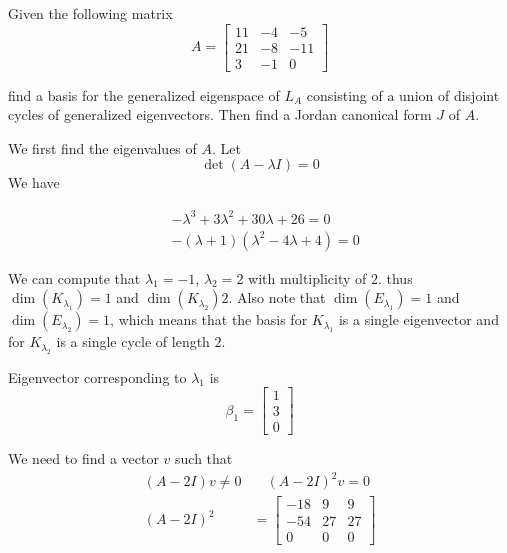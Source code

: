 \begin{homeworkProblem}
Given the following matrix
\[
  A = \begin{bmatrix}
    11 & -4 & -5 \\
    21 & -8 & -11 \\
    3 & -1 & 0
  \end{bmatrix}
\]

find a basis for the generalized eigenspace of $L_A$ consisting of a union of disjoint cycles of generalized eigenvectors. Then find a Jordan canonical form $J$ of $A$.

\solution

We first find the eigenvalues of $A$. Let
\[
  \det(A -\lambda I ) = 0
\]
We have

\[
  \begin{aligned}
    &-\lambda^3 + 3 \lambda^2 + 30 \lambda +26 = 0\\
    &-(\lambda + 1)(\lambda^2 - 4\lambda +4) = 0
  \end{aligned}
\]

We can compute that $\lambda_1 = -1$, $\lambda_2 = 2$ with multiplicity of $2$. thus $\dim(K_{\lambda_1}) = 1$ and $\dim(K_{\lambda_2}) 2$. Also note that $\dim(E_{\lambda_1}) = 1 $ and $\dim(E_{\lambda_2}) = 1$, which means that the basis for $K_{\lambda_1}$ is a single eigenvector and for $K_{\lambda_2}$ is a single cycle of length $2$.

Eigenvector corresponding to $\lambda_1$ is
\[
  \beta_1 = \begin{bmatrix}
    1 \\ 3 \\ 0
  \end{bmatrix}
\]

We need to find a vector $v$ such that
\[
  \begin{aligned}
    (A-2I)v \neq 0 &\quad (A-2I)^2 v = 0\\
  (A-2I)^2 &= \begin{bmatrix}
    -18 & 9 & 9 \\
    -54 & 27 & 27 \\
    0 & 0 & 0
  \end{bmatrix}
  \end{aligned}
\]


\end{homeworkProblem}
